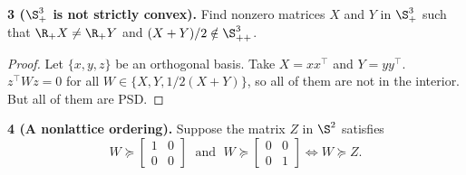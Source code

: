 \documentclass[../borwein-lewis_notes.tex]{subfiles}
\begin{document}
\noindent\textbf{3 ($\S_+^3$ is not strictly convex).} Find nonzero
matrices $X$ and $Y$ in $\S_+^3$ such that $\R_+X\neq\R_+Y$ and 
$(X+Y)/2\notin \S_{++}^3$. 
\begin{proof}
Let $\{x,y,z\}$ be an orthogonal basis.
Take $X=xx^\top$ and $Y=yy^\top$.
$z^\top W z = 0$ for all $W\in\{X,Y, 1/2(X+Y)\}$, so all of them 
are not in the interior. But all of them are PSD.
\end{proof}
\noindent\textbf{4 (A nonlattice ordering).} Suppose the matrix $Z$ in 
$\S^2$ satisfies 
\begin{equation*}
W\succeq \begin{bmatrix} 1&0\\ 0&0\end{bmatrix} \;\text{ and }\;
W\succeq \begin{bmatrix} 0&0\\ 0&1\end{bmatrix} \iff 
W \succeq Z.
\end{equation*}
\end{document}
